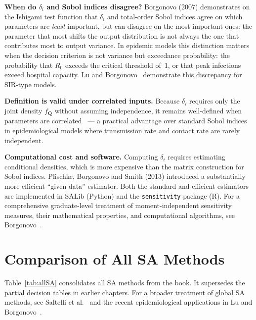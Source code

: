 \textbf{When do $\delta_i$ and Sobol indices disagree?}
Borgonovo (2007) demonstrates on the Ishigami test function that
$\delta_i$ and total-order Sobol indices agree on which parameters
are \emph{least} important, but can disagree on the most important
ones: the parameter that most shifts the output distribution is not
always the one that contributes most to output variance.
In epidemic models this distinction matters when the decision criterion
is not variance but exceedance probability: the probability that
$R_0$ exceeds the critical threshold of~1, or that peak infections
exceed hospital capacity.
Lu and Borgonovo~\cite{lu2023global} demonstrate this discrepancy
for SIR-type models.

\textbf{Definition is valid under correlated inputs.}
Because $\delta_i$ requires only the joint density $f_{\mathbf{Q}}$
without assuming independence, it remains well-defined when parameters
are correlated~\cite{borgonovo2007new} --- a practical advantage over
standard Sobol indices in epidemiological models where transmission
rate and contact rate are rarely independent.

\textbf{Computational cost and software.}
Computing $\delta_i$ requires estimating conditional densities, which
is more expensive than the matrix construction for Sobol indices.
Plischke, Borgonovo and Smith (2013) introduced a substantially more
efficient ``given-data'' estimator.
Both the standard and efficient estimators are implemented in SALib
(Python) and the \texttt{sensitivity} package (R).
For a comprehensive graduate-level treatment of moment-independent
sensitivity measures, their mathematical properties, and computational
algorithms, see Borgonovo~\cite{borgonovo2017sensitivity}.

\section{Comparison of All SA Methods}\label{sec:methodcomparison}

Table~\ref{tab:allSA} consolidates all SA methods from the book.
It supersedes the partial decision tables in earlier chapters.
For a broader treatment of global SA methods, see Saltelli et al.~\cite{saltelli2008global,saltelli2000sensitivity}
and the recent epidemiological applications in Lu and Borgonovo~\cite{lu2023global}.

